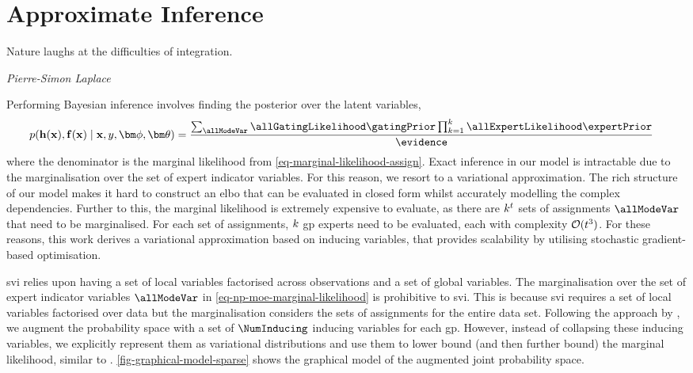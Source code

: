 \documentclass{mimosis-class/mimosis}
\numberwithin{equation}{chapter}
\newcommand{\numData}{\ensuremath{t}}
\newcommand{\modeInd}{\ensuremath{k}}
\newcommand{\NumData}{\ensuremath{\MakeUppercase{\numData}}}
\newcommand{\ModeInd}{\ensuremath{\MakeUppercase{\modeInd}}}
\newcommand{\allData}[1]{\ensuremath{\MakeUppercase{#1}}}
\newcommand{\x}{\ensuremath{\mathbf{x}}}
\newcommand{\y}{\ensuremath{y}}
\newcommand{\allInput}{\ensuremath{\allData{\x}}}
\newcommand{\allOutput}{\ensuremath{\allData{\y}}}
\newcommand{\gatingFunc}{\ensuremath{h}}
\newcommand{\GatingFunc}{\ensuremath{\mathbf{\gatingFunc}}}
\newcommand{\latentFunc}{\ensuremath{f}}
\newcommand{\LatentFunc}{\ensuremath{\mathbf{\latentFunc}}}
\newcommand{\gatingParams}{\ensuremath{\bm\phi}}
\newcommand{\expertParams}{\ensuremath{\bm\theta}}
\begin{document}
{\section{Approximate Inference \label{sec-inference}}
\label{sec:org8fed6b7}
\epigraph{Nature laughs at the difficulties of integration.}{\textit{Pierre-Simon Laplace}}
Performing Bayesian inference involves finding the posterior over the latent variables,
\begin{align} \label{eq-}
p(\GatingFunc(\allInput), \LatentFunc(\allInput) \mid \allInput, \allOutput, \gatingParams, \expertParams)
&= \frac{\sum_{\allModeVar} \allGatingLikelihood \gatingPrior
\prod_{\modeInd=1}^{\ModeInd} \allExpertLikelihood \expertPrior}{\evidence}
\end{align}
where the denominator is the marginal likelihood from \cref{eq-marginal-likelihood-assign}.
Exact inference in our model is intractable due to the marginalisation over the set of expert indicator variables.
For this reason, we resort to a variational approximation.
The rich structure of our model makes it hard to construct an \acrshort{elbo} that can
be evaluated in closed form whilst accurately modelling the complex dependencies.
Further to this, the marginal likelihood is extremely expensive to evaluate,
as there are \(\ModeInd^{\NumData}\) sets of assignments \(\allModeVar\) that need to be marginalised.
For each set of assignments, \(\ModeInd\) \acrshort{gp} experts need to be evaluated, each with
complexity \(\mathcal{O}(\NumData^{3})\).
For these reasons, this work derives a variational approximation based on inducing variables, that provides scalability
by utilising stochastic gradient-based optimisation.

\acrfull{svi} \citep{hoffmanStochastic2013} relies upon having a set of local variables
factorised across observations and a set of global variables.
The marginalisation over the set of expert indicator variables \(\allModeVar\)
in \cref{eq-np-moe-marginal-likelihood} is prohibitive to \acrshort{svi}.
This is because \acrshort{svi} requires a set of local variables factorised over data but the
marginalisation considers the sets of assignments for the entire data set.
Following the approach by \cite{titsiasVariational2009}, we augment the probability space
with a set of \(\NumInducing\) inducing variables for each \acrshort{gp}.
However, instead of collapsing these inducing variables, we explicitly
represent them as variational distributions and use them to lower bound
(and then further bound) the marginal likelihood, similar to
\cite{hensmanGaussian2013,hensmanScalable2015}.
\cref{fig-graphical-model-sparse} shows the graphical model of the augmented joint probability space.


}
\end{document}
